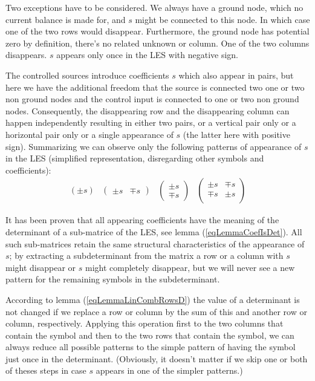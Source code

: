 Two exceptions have to be considered. We always have a ground node, which
no current balance is made for, and $s$ might be connected to this node. In
which case one of the two rows would disappear. Furthermore, the ground
node has potential zero by definition, there's no related unknown or
column. One of the two columns disappears. $s$ appears only once in the
LES with negative sign.

The controlled sources introduce coefficients $s$ which also appear in
pairs, but here we have the additional freedom that the source is connected
two one or two non ground nodes and the control input is connected to one
or two non ground nodes. Consequently, the disappearing row and the
disappearing column can happen independently resulting in either two
pairs, or a vertical pair only or a horizontal pair only or a single
appearance of $s$ (the latter here with positive sign). Summarizing we can
observe only the following patterns of appearance of $s$ in the LES
(simplified representation, disregarding other symbols and coefficients):
\begin{equation}
\label{eqPatternsOfAppearance}
\begin{array}{cccc}
\left(
\pm s
\right)
&
\left(
\begin{array}{cc}
\pm s & \mp s
\end{array}
\right)
&
\left(
\begin{array}{c}
\pm s \\
\mp s
\end{array}
\right)
&
\left(
\begin{array}{cc}
\pm s & \mp s \\
\mp s & \pm s \\
\end{array}
\right)
\end{array}
\end{equation}

It has been proven that all appearing coefficients have the meaning of the
determinant of a sub-matrice of the LES, see lemma (\ref{eqLemmaCoefIsDet}).
All such sub-matrices retain the same structural characteristics of the
appearance of $s$; by extracting a subdeterminant from the matrix a row
or a column with $s$ might disappear or $s$ might completely disappear,
but we will never see a new pattern for the remaining symbols in the
subdeterminant.

According to lemma (\ref{eqLemmaLinCombRowsD}) the value of a determinant
is not changed if we replace a row or column by the sum of this and
another row or column, respectively. Applying this operation first to the
two columns that contain the symbol and then to the two rows that contain
the symbol, we can always reduce all possible patterns to the simple
pattern of having the symbol just once in the determinant. (Obviously, it
doesn't matter if we skip one or both of theses steps in case $s$ appears
in one of the simpler patterns.)

